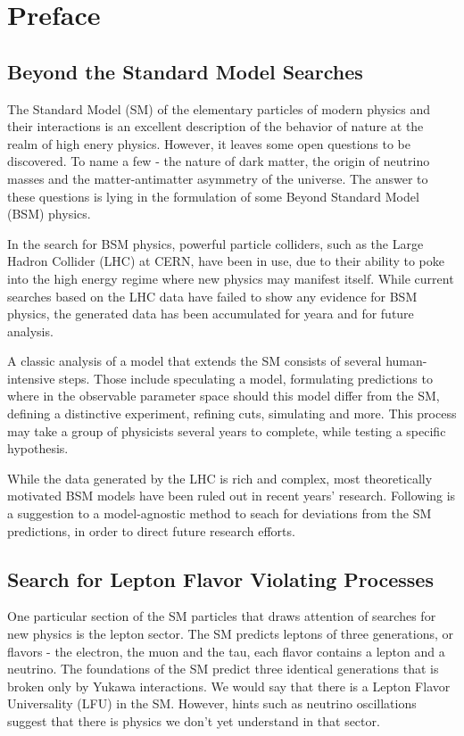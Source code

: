 \documentclass[../ddppaper3.tex]{subfiles}
\begin{document}
\section{Preface}

\subsection{Beyond the Standard Model Searches}

The Standard Model (SM) of the elementary particles of modern physics and their interactions is an excellent description of the behavior of nature at the realm of high enery physics. However, it leaves some open questions to be discovered. To name a few - the nature of dark matter, the origin of neutrino masses and the matter-antimatter asymmetry of the universe. The answer to these questions is lying in the formulation of some Beyond Standard Model (BSM) physics.

In the search for BSM physics, powerful particle colliders, such as the Large Hadron Collider (LHC) at CERN, have been in use, due to their ability to poke into the high energy regime where new physics may manifest itself. While current searches based on the LHC data have failed to show any evidence for BSM physics, the generated data has been accumulated for yeara and for future analysis.

A classic analysis of a model that extends the SM consists of several human-intensive steps. Those include speculating a model, formulating predictions to where in the observable parameter space should this model differ from the SM, defining a distinctive experiment, refining cuts, simulating and more. This process may take a group of physicists several years to complete, while testing a specific hypothesis.

While the data generated by the LHC is rich and complex, most theoretically motivated BSM models have been ruled out in recent years' research. Following is a suggestion to a model-agnostic method to seach for deviations from the SM predictions, in order to direct future research efforts.

\subsection{Search for Lepton Flavor Violating Processes}

One particular section of the SM particles that draws attention of searches for new physics is the lepton sector. The SM predicts leptons of three generations, or flavors - the electron, the muon and the tau, each flavor contains a lepton and a neutrino. The foundations of the SM predict three identical generations that is broken only by Yukawa interactions. We would say that there is a Lepton Flavor Universality (LFU) in the SM. However, hints such as neutrino oscillations suggest that there is physics we don't yet understand in that sector.
\end{document}
